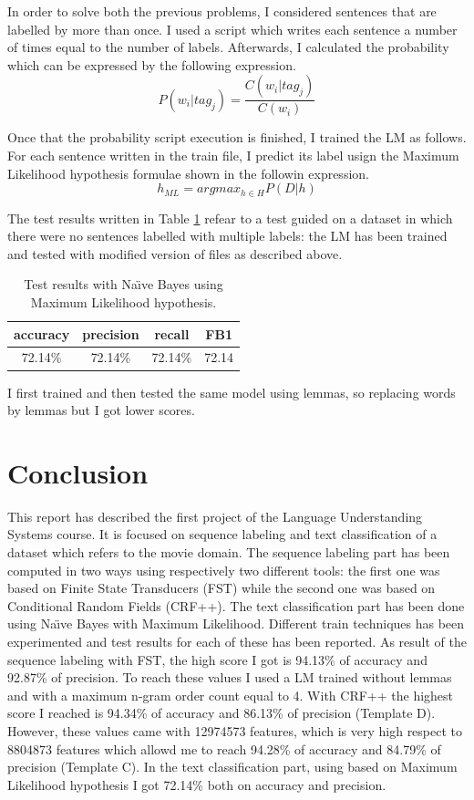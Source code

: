 \documentclass[a4paper,7pt,oneside]{book}
\newcommand\chap[1]{\chapter*{#1}\addcontentsline{toc}{chapter}{\protect\numberline{}#1}}
\begin{document}
\noindent
In order to solve both the previous problems, I considered sentences that are labelled by more than once. I used a script which writes each sentence a number of times equal to the number of labels. Afterwards, I calculated the probability which can be expressed by the following expression.
\[ P(w_i | tag_j) = \frac{C(w_i | tag_j)}{C(w_i)} \]

\noindent
Once that the probability script execution is finished, I trained the LM as follows. For each sentence written in the train file, I predict its label usign the Maximum Likelihood hypothesis formulae shown in the followin expression.
\[ h_{ML} = arg max_{h \in H} P(D|h) \]

\noindent
The test results written in Table \ref{table:bayes_results_max_like} refear to a test guided on a dataset in which there were no sentences labelled with multiple labels: the LM has been trained and tested with modified version of files as described above.

\begin{table}[h!]
\small
	\begin{center}
	\begin{tabular}{|c|c|c|c|}
		\hline
		accuracy & precision & recall & FB1 \\ \hline
		72.14\% & 72.14\% & 72.14\% & 72.14 \\ \hline
	\end{tabular}
	\caption{Test results with Na\"{\i}ve Bayes using Maximum Likelihood hypothesis.}
	\label{table:bayes_results_max_like}
	\end{center}
\end{table}

\noindent
I first trained and then tested the same model using lemmas, so replacing words by lemmas but I got lower scores.

\chap{Conclusion}

This report has described the first project of the Language Understanding Systems course. It is focused on sequence labeling and text classification of a dataset which refers to the movie domain. The sequence labeling part has been computed in two ways using respectively two different tools: the first one was based on Finite State Transducers (FST) while the second one was based on Conditional Random Fields (CRF++). The text classification part has been done using Na\"{\i}ve Bayes with Maximum Likelihood. Different train techniques has been experimented and test results for each of these has been reported.
\noindent
As result of the sequence labeling with FST, the high score I got is 94.13\% of accuracy and 92.87\% of precision. To reach these values I used a LM trained without lemmas and with a maximum n-gram order count equal to 4.
\noindent
With CRF++ the highest score I reached is 94.34\% of accuracy and 86.13\% of precision (Template D). However, these values came with 12974573 features, which is very high respect to 8804873 features which allowd me to reach 94.28\% of accuracy and 84.79\% of precision (Template C).
\noindent
In the text classification part, using based on Maximum Likelihood hypothesis I got 72.14\% both on accuracy and precision.
\end{document}
